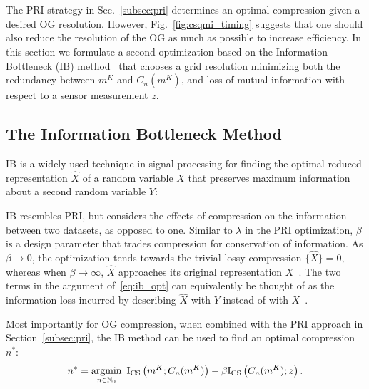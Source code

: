 \chapter{}
\label{chapter4}

The PRI strategy in Sec.~\ref{subsec:pri} determines an optimal compression given a desired OG resolution. However, Fig.~\ref{fig:csqmi_timing} suggests that one should also reduce the resolution of the OG as much as possible to increase efficiency. In this section we formulate a second optimization based on the Information Bottleneck (IB) method~\cite{tishby2000information} that chooses a grid resolution minimizing both the redundancy between $m^{K}$ and
$C_{n}(m^{K})$, and loss of mutual information with respect to a sensor measurement $z$.


\section{The Information Bottleneck Method}

IB is a widely used technique in signal processing for finding the optimal reduced representation $\hat{X}$ of a random variable $X$ that preserves maximum information about a second random variable $Y$:
%

IB resembles PRI, but considers the effects of compression on the information between two datasets, as opposed to one. Similar to $\lambda$ in the PRI optimization, $\beta$ is a design parameter that trades compression for conservation of information. As $\beta \rightarrow 0$, the optimization tends towards the trivial lossy compression $\{\hat{X}\}=0$, whereas when $\beta \rightarrow \infty$, $\hat{X}$ approaches its original representation $X$~\cite{principe2010information}. The two terms in the argument of~\eqref{eq:ib_opt} can equivalently be thought of as the information loss incurred by describing $\hat{X}$ with $Y$ instead of with $X$~\cite{geiger2011information}.

Most importantly for OG compression, when combined with the PRI approach in Section~\ref{subsec:pri}, the IB method can be used to find an optimal compression $n^{*}$:
%
\begin{gather}
    n^{*}
    =
    \argmin_{
        n \in \mbb{N}_{0}
    } \, \,
    \text{I}_{\text{CS}}\left(m^{K}; C_{n}(m^{K})\right)
    -
    \beta
    \text{I}_{\text{CS}}\left(C_{n}(m^{K}); z\right).
    \label{eq:ib_arg_opt}
\end{gather}

